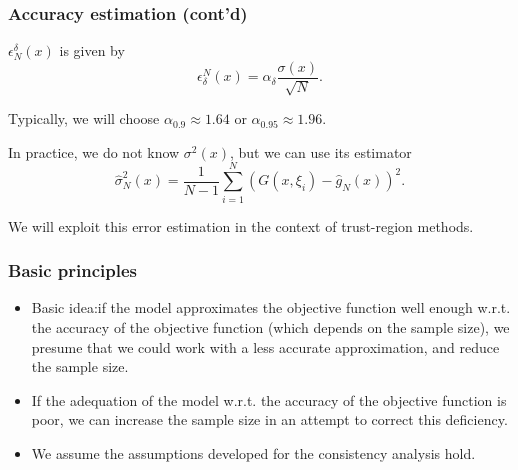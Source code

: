 \documentclass{beamer}
\begin{document}
\begin{frame}
\frametitle{Accuracy estimation (cont'd)}

$\epsilon^{\delta}_N(x)$ is given by
\[
\epsilon_{\delta}^N(x) = \alpha_{\delta} \frac{\sigma(x)}{\sqrt{N}}.
\]

\mbox{}

Typically, we will choose $\alpha_{0.9} \approx 1.64$ or $\alpha_{0.95} \approx 1.96$.

\mbox{}

In practice, we do not know $\sigma^2(x)$, but we can use its estimator
\[
\hat{\sigma}^2_N(x) = \frac{1}{N-1}\sum_{i = 1}^N ( G(x,\xi_i) -
\hat{g}_N(x))^2.
\]

\mbox{}

We will exploit this error estimation in the context of trust-region methods.


\end{frame}

\begin{frame}
\frametitle{Basic principles}

\begin{itemize}
\item
Basic idea:if the model approximates the objective function well enough w.r.t. the accuracy of the objective function (which depends on the sample size), we presume that we could work with a less accurate approximation, and reduce the sample size.
\item
If the adequation of the model w.r.t. the accuracy of the objective function is poor, we can increase the sample size in an attempt to correct this deficiency.
\item
We assume the assumptions developed for the consistency analysis hold.
\end{itemize}

\end{frame}
\end{document}
